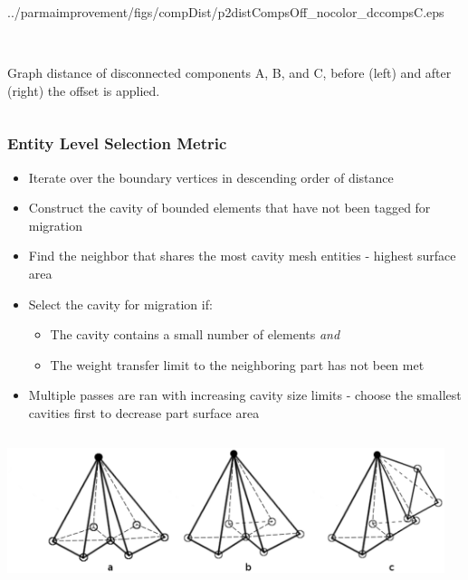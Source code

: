 \documentclass{beamer}
\begin{document}
\begin{frame}
\begin{columns}
\begin{column}{0.4\textwidth}
\begin{column}{0.5\textwidth}
          {../parmaimprovement/figs/compDist/p2distCompsOff_nocolor_dccompsC.eps}
      \end{column}
      \\Graph distance of disconnected components A, B, and C, before 
      (left) and after (right) the offset is applied.
    \end{column}
  \end{columns}
\end{frame}

\begin{frame}
  \frametitle{Entity Level Selection Metric}
  \begin{itemize}
    \item Iterate over the boundary vertices in descending order of distance
    \item Construct the cavity of bounded elements that have not been tagged 
      for migration
    \item Find the neighbor that shares the most cavity mesh entities 
      - highest surface area
    \item Select the cavity for migration if:
      \begin{itemize}
        \item The cavity contains a small number of elements \emph{and}
        \item The weight transfer limit to the neighboring part has not been met
      \end{itemize}
    \item Multiple passes are ran with increasing cavity size limits 
      - choose the smallest cavities first to decrease part surface area
  \end{itemize}
  \begin{columns} 
    \begin{column}{0.4\textwidth}
      \centering
      \includegraphics[width=\textwidth]{figs/vtxCavitiesFaceDisconnected.eps}\\
    \end{column}
    \begin{column}{0.3\textwidth}

\end{column}
\end{columns}
\end{frame}
\end{document}
